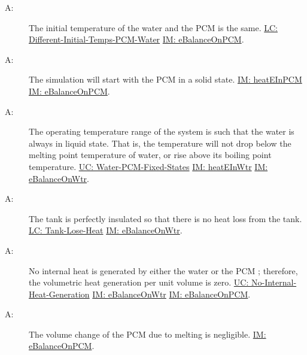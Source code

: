 \documentclass[12pt]{article}
\newcounter{assumpnum}
\newcommand{\atheassumpnum}{A\theassumpnum}
\begin{document}
\begin{description}
\item[\atheassumpnum\label{A:Same-Initial-Temp-Water-PCM}:]The initial temperature of the water and the PCM is the same. \hyperref[likeChgDITPW]{LC: Different-Initial-Temps-PCM-Water} \hyperref[IM:eBalanceOnPCM]{IM: eBalanceOnPCM}.
\end{description}
\begin{description}
\item[\atheassumpnum\label{A:PCM-Initially-Solid}:]The simulation will start with the PCM in a solid state. \hyperref[IM:heatEInPCM]{IM: heatEInPCM} \hyperref[IM:eBalanceOnPCM]{IM: eBalanceOnPCM}.
\end{description}
\begin{description}
\item[\atheassumpnum\label{A:Water-Always-Liquid}:]The operating temperature range of the system is such that the water is always in liquid state. That is, the temperature will not drop below the melting point temperature of water, or rise above its boiling point temperature. \hyperref[unlikeChgWPFS]{UC: Water-PCM-Fixed-States} \hyperref[IM:heatEInWtr]{IM: heatEInWtr} \hyperref[IM:eBalanceOnWtr]{IM: eBalanceOnWtr}.
\end{description}
\begin{description}
\item[\atheassumpnum\label{A:Perfect-Insulation-Tank}:]The tank is perfectly insulated so that there is no heat loss from the tank. \hyperref[likeChgTLH]{LC: Tank-Lose-Heat} \hyperref[IM:eBalanceOnWtr]{IM: eBalanceOnWtr}.
\end{description}
\begin{description}
\item[\atheassumpnum\label{A:No-Internal-Heat-Generation-By-Water-PCM}:]No internal heat is generated by either the water or the PCM ; therefore, the volumetric heat generation per unit volume is zero. \hyperref[unlikeChgNIHG]{UC: No-Internal-Heat-Generation} \hyperref[IM:eBalanceOnWtr]{IM: eBalanceOnWtr} \hyperref[IM:eBalanceOnPCM]{IM: eBalanceOnPCM}.
\end{description}
\begin{description}
\item[\atheassumpnum\label{A:Volume-Change-Melting-PCM-Negligible}:]The volume change of the PCM due to melting is negligible. \hyperref[IM:eBalanceOnPCM]{IM: eBalanceOnPCM}.
\end{description}
\end{document}
